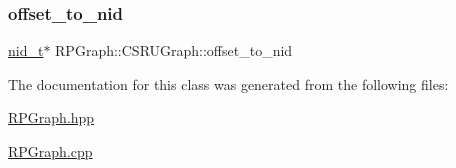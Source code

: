 \mbox{\label{classRPGraph_1_1CSRUGraph_ad59e162f4c9eeac87a0fbd5d3c054dbe}} 
\subsubsection{\texorpdfstring{offset\+\_\+to\+\_\+nid}{offset\_to\_nid}}
{\footnotesize\ttfamily \mbox{\hyperlink{namespaceRPGraph_ab3ae34f1ab88e48f43794c30c8697b74}{nid\+\_\+t}}$\ast$ R\+P\+Graph\+::\+C\+S\+R\+U\+Graph\+::offset\+\_\+to\+\_\+nid}



The documentation for this class was generated from the following files\+:\begin{DoxyCompactItemize}
\item 
\mbox{\hyperlink{RPGraph_8hpp}{R\+P\+Graph.\+hpp}}\item 
\mbox{\hyperlink{RPGraph_8cpp}{R\+P\+Graph.\+cpp}}\end{DoxyCompactItemize}
